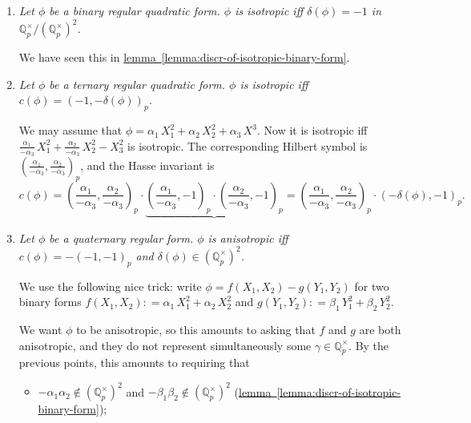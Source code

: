 \documentclass{article}
\newcommand{\dfn}{\mathrel{\mathop:}=}
\newcommand{\QQ}{\mathbb{Q}}
\newcommand{\refref}[2]{\hyperref[#2]{#1~\ref*{#2}}}
\theoremstyle{myplain}
\theoremstyle{mydefinition}
\begin{document}
\begin{enumerate}
\item \emph{Let $\phi$ be a binary regular quadratic form. $\phi$ is isotropic
    iff $\delta (\phi) = -1$ in $\QQ_p^\times / (\QQ_p^\times)^2$.}

  We have seen this in \refref{lemma}{lemma:discr-of-isotropic-binary-form}.

\item \emph{Let $\phi$ be a ternary regular quadratic form. $\phi$ is isotropic
    iff $c (\phi) = (-1, -\delta (\phi))_p$.}

  We may assume that $\phi = \alpha_1\,X_1^2 + \alpha_2\,X_2^2 +
  \alpha_3\,X^3$. Now it is isotropic iff
  $\frac{\alpha_1}{-\alpha_3}\,X_1^2 + \frac{\alpha_2}{-\alpha_3}\,X_2^2 -
  X_3^2$ is isotropic. The corresponding Hilbert symbol is
  $\left(\frac{\alpha_1}{-\alpha_3}, \frac{\alpha_2}{-\alpha_3}\right)_p$, and
  the Hasse invariant is
  \[ c(\phi) =
    \left(\frac{\alpha_1}{-\alpha_3}, \frac{\alpha_2}{-\alpha_3}\right)_p \cdot
    \underbrace{\left(\frac{\alpha_1}{-\alpha_3}, -1\right)_p \cdot \left(\frac{\alpha_2}{-\alpha_3}, -1\right)_p} =
    \left(\frac{\alpha_1}{-\alpha_3}, \frac{\alpha_2}{-\alpha_3}\right)_p \cdot
    (-\delta(\phi), -1)_p. \]

\item \emph{Let $\phi$ be a quaternary regular form. $\phi$ is anisotropic iff
    $c (\phi) = -(-1,-1)_p$ and $\delta (\phi) \in (\QQ_p^\times)^2$.}

  We use the following nice trick: write $\phi = f (X_1,X_2) - g (Y_1,Y_2)$ for
  two binary forms $f (X_1,X_2) \dfn \alpha_1\,X_1^2 + \alpha_2\,X_2^2$ and
  $g (Y_1,Y_2) \dfn \beta_1\,Y_1^2 + \beta_2\,Y_2^2$.

  We want $\phi$ to be anisotropic, so this amounts to asking that $f$ and $g$
  are both anisotropic, and they do not represent simultaneously some
  $\gamma \in \QQ_p^\times$. By the previous points, this amounts to requiring
  that
  \begin{itemize}
  \item $-\alpha_1\alpha_2 \notin (\QQ_p^\times)^2$ and
    $-\beta_1\beta_2 \notin (\QQ_p^\times)^2$
    (\refref{lemma}{lemma:discr-of-isotropic-binary-form});


\end{itemize}
\end{enumerate}
\end{document}
